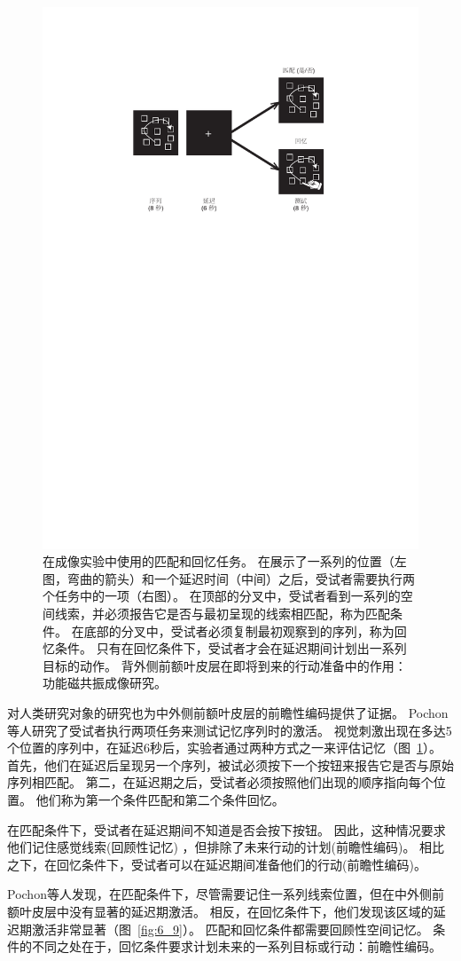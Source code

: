 \begin{figure}
	\centering
	\includegraphics[width=0.58\linewidth]{chap6/6_8}
	\caption{在成像实验中使用的匹配和回忆任务。
		在展示了一系列的位置（左图，弯曲的箭头）和一个延迟时间（中间）之后，受试者需要执行两个任务中的一项（右图）。
		在顶部的分叉中，受试者看到一系列的空间线索，并必须报告它是否与最初呈现的线索相匹配，称为匹配条件。
		在底部的分叉中，受试者必须复制最初观察到的序列，称为回忆条件。
		只有在回忆条件下，受试者才会在延迟期间计划出一系列目标的动作。
		背外侧前额叶皮层在即将到来的行动准备中的作用：功能磁共振成像研究\cite{pochon2001role}。}
	\label{fig:6_8}
\end{figure}


对人类研究对象的研究也为中外侧前额叶皮层的前瞻性编码提供了证据。
Pochon等人\cite{pochon2001role}研究了受试者执行两项任务来测试记忆序列时的激活。
视觉刺激出现在多达5个位置的序列中，在延迟6秒后，实验者通过两种方式之一来评估记忆（图~\ref{fig:6_8}）。
首先，他们在延迟后呈现另一个序列，被试必须按下一个按钮来报告它是否与原始序列相匹配。
第二，在延迟期之后，受试者必须按照他们出现的顺序指向每个位置。
他们称为第一个条件匹配和第二个条件回忆。


在匹配条件下，受试者在延迟期间不知道是否会按下按钮。
因此，这种情况要求他们记住感觉线索(回顾性记忆) ，但排除了未来行动的计划(前瞻性编码)。
相比之下，在回忆条件下，受试者可以在延迟期间准备他们的行动(前瞻性编码)。


Pochon等人发现，在匹配条件下，尽管需要记住一系列线索位置，但在中外侧前额叶皮层中没有显著的延迟期激活。
相反，在回忆条件下，他们发现该区域的延迟期激活非常显著（图~\ref{fig:6_9}）。
匹配和回忆条件都需要回顾性空间记忆。
条件的不同之处在于，回忆条件要求计划未来的一系列目标或行动：前瞻性编码。


